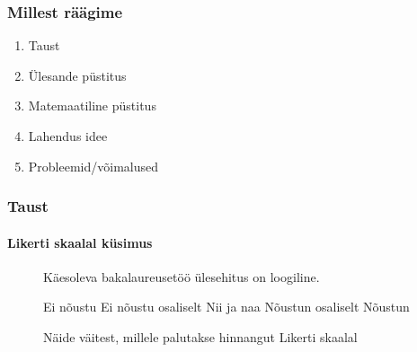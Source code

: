 \documentclass[aspectratio=149]{beamer}
\begin{document}
  \begin{frame}
    \frametitle{Millest räägime}
    \begin{enumerate}[I]
    \item Taust
    \item \"Ulesande p\"ustitus
    \item Matemaatiline p\"ustitus
    \item Lahendus idee 
    \item Probleemid/võimalused  
    
    \end{enumerate}
  \end{frame}
  \begin{frame}
    \frametitle{Taust}
    \framesubtitle{Likerti skaalal k\"usimus}
    \begin{figure}[H]


		\colorbox{background_example}{\parbox{\textwidth}{

		\vspace{1mm}

		Käesoleva bakalaureusetöö \"ulesehitus on loogiline.

		\vspace{5pt}
		
		\begin{Form}
			\def\DefaultWidthofChoiceMenu{12pt}%


			\scriptsize
			\ChoiceMenu[bordercolor = gray,disabled = 						true,name=optionE,radio,radiosymbol=\ding{108}]{\mbox{}}\null Ei nõustu
			\ChoiceMenu[bordercolor = gray,disabled = true,name=optionD,radio,radiosymbol=\ding{108}]{\mbox{}}\null Ei nõustu osaliselt
			\ChoiceMenu[bordercolor = gray,disabled = true,name=optionC,radio,radiosymbol=\ding{108}]{\mbox{}}\null Nii ja naa
			\ChoiceMenu[bordercolor = gray,disabled = true, name=optionB,radio,radiosymbol=\ding{108}]{\mbox{}}\null Nõustun osaliselt
			\ChoiceMenu[bordercolor = gray,disabled = true,name=optionA,radio,radiosymbol=\ding{108}]{\mbox{}}\null Nõustun
			\normalsize


\end{Form}}}
\caption{Näide väitest, millele palutakse hinnangut Likerti skaalal}
\label{likert_question}
	\end{figure}

  \end{frame}
\end{document}

